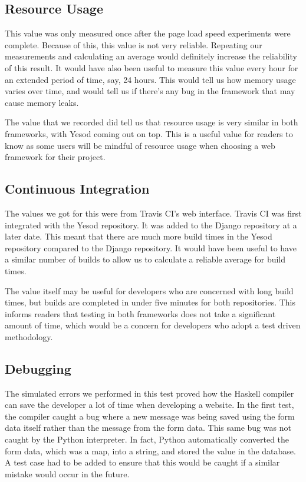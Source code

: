 \subsection{Resource Usage}

This value was only measured once after the page load speed experiments
were complete. Because of this, this value is not very reliable. Repeating
our measurements and calculating an average would definitely increase the
reliability of this result. It would have also been useful to measure this
value every hour for an extended period of time, say, 24 hours. This would
tell us how memory usage varies over time, and would tell us if there's
any bug in the framework that may cause memory leaks.

The value that we recorded did tell us that resource usage is very similar in
both frameworks, with Yesod coming out on top. This is a useful value
for readers to know as some users will be mindful of resource usage when
choosing a web framework for their project.

\subsection{Continuous Integration}

The values we got for this were from Travis CI's web interface. Travis CI
was first integrated with the Yesod repository. It was added to the
Django repository at a later date. This meant that there are much more
build times in the Yesod repository compared to the Django repository.
It would have been useful to have a similar number of builds to allow us
to calculate a reliable average for build times.

The value itself may be useful for developers who are concerned with long
build times, but builds are completed in under five minutes for both
repositories. This informs
readers that testing in both frameworks does not take a significant
amount of time, which would be a concern for developers who adopt
a test driven methodology.

\subsection{Debugging}

The simulated errors we performed in this test proved how the Haskell
compiler can save the developer a lot of time when developing a website.
In the first test, the compiler caught a bug where a new message was
being saved using the form data itself rather than the message from the
form data. This same bug was not caught by the Python interpreter. 
In fact, Python automatically converted the form data, which was a map, 
into a string, and stored the value in the database. A test case had
to be added to ensure that this would be caught if a similar mistake
would occur in the future.

